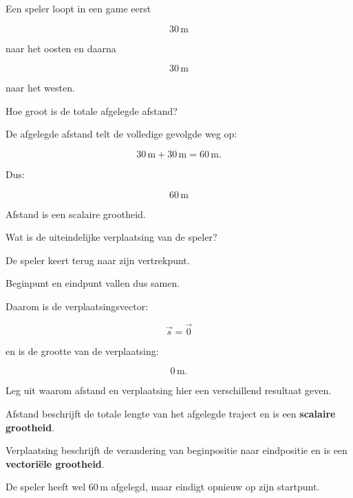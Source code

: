 \documentclass{ximera}
\begin{document}
\begin{oefening}{\oefU}

Een speler loopt in een game eerst

\[
30\,\si{\meter}
\]

naar het oosten en daarna

\[
30\,\si{\meter}
\]

naar het westen.

\begin{question}
Hoe groot is de totale afgelegde afstand?

\begin{oplossing}
De afgelegde afstand telt de volledige gevolgde weg op:

\[
30\,\si{\meter}+30\,\si{\meter}
=
60\,\si{\meter}.
\]

Dus:

\[
\boxed{60\,\si{\meter}}
\]

Afstand is een scalaire grootheid.
\end{oplossing}
\end{question}


\begin{question}
Wat is de uiteindelijke verplaatsing van de speler?

\begin{oplossing}
De speler keert terug naar zijn vertrekpunt.

Beginpunt en eindpunt vallen dus samen.

Daarom is de verplaatsingsvector:

\[
\boxed{\vec{s}=\vec{0}}
\]

en is de grootte van de verplaatsing:

\[
\boxed{0\,\si{\meter}}.
\]
\end{oplossing}
\end{question}


\begin{question}
Leg uit waarom afstand en verplaatsing hier een verschillend resultaat geven.

\begin{oplossing}
Afstand beschrijft de totale lengte van het afgelegde traject en is een
\textbf{scalaire grootheid}.

Verplaatsing beschrijft de verandering van beginpositie naar eindpositie en is
een \textbf{vectoriële grootheid}.

De speler heeft wel $60\,\si{\meter}$ afgelegd, maar eindigt opnieuw op zijn
startpunt.
\end{oplossing}
\end{question}

\end{oefening}
\end{document}
